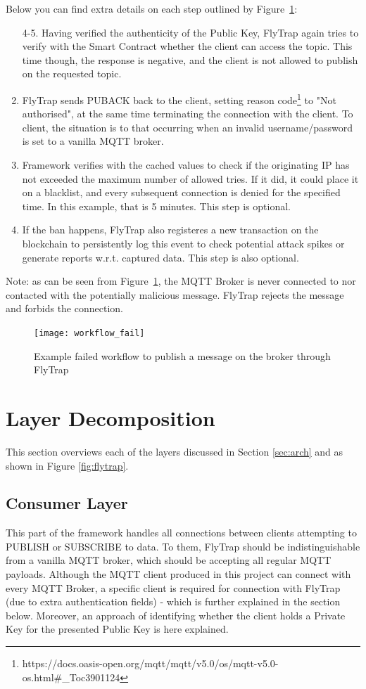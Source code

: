 Below you can find extra details on each step outlined by Figure~\ref{fig:workflow_fail}:
\begin{enumerate}\addtocounter{enumi}{4}
    \item[4-5.] Having verified the authenticity of the Public Key, FlyTrap again tries to verify with the Smart Contract whether the client can access the topic. This time though, the response is negative, and the client is not allowed to publish on the requested topic.
    \item FlyTrap sends PUBACK back to the client, setting reason code\footnote{https://docs.oasis-open.org/mqtt/mqtt/v5.0/os/mqtt-v5.0-os.html\#\_Toc3901124} to "Not authorised", at the same time terminating the connection with the client. To client, the situation is to that occurring when an invalid username/password is set to a vanilla MQTT broker.
    \item Framework verifies with the cached values to check if the originating IP has not exceeded the maximum number of allowed tries. If it did, it could place it on a blacklist, and every subsequent connection is denied for the specified time. In this example, that is 5 minutes. This step is optional.
    \item If the ban happens, FlyTrap also registeres a new transaction on the blockchain to persistently log this event to check potential attack spikes or generate reports w.r.t.  captured data. This step is also optional.
\end{enumerate}

Note: as can be seen from Figure~\ref{fig:workflow_fail}, the MQTT Broker is never connected to nor contacted with the potentially malicious message. FlyTrap rejects the message and forbids the connection. 
\begin{figure}[h]
    \centering
    \texttt{[image: workflow\_fail]}
    \caption{Example failed workflow to publish a message on the broker through FlyTrap}
    \label{fig:workflow_fail}
\end{figure}

\section{Layer Decomposition}
This section overviews each of the layers discussed in Section \ref{sec:arch} and as shown in Figure \ref{fig:flytrap}.
\subsection{Consumer Layer}
This part of the framework handles all connections between clients attempting to PUBLISH or SUBSCRIBE to data. To them, FlyTrap should be indistinguishable from a vanilla MQTT broker, which should be accepting all regular MQTT payloads. Although the MQTT client produced in this project can connect with every MQTT Broker, a specific client is required for connection with FlyTrap (due to extra authentication fields) - which is further explained in the section below. Moreover, an approach of identifying whether the client holds a Private Key for the presented Public Key is here explained. 
